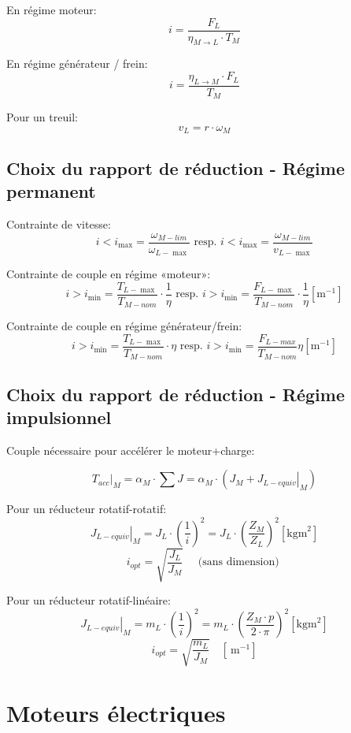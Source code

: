 \documentclass[10pt]{article} %
\begin{document}
\begin{multicols}{3}
\begin{flushleft}
			En régime moteur:
			\[i = \frac{F_L}{\eta_{M \rightarrow L} \cdot T_M} \]
			
			En régime générateur / frein:
			\[i = \frac{\eta_{L \rightarrow M} \cdot F_L}{T_M} \]
			
			Pour un treuil:
			\[v_L = r \cdot \omega_M \]

		\subsection*{Choix du rapport de réduction - Régime permanent}
	
			Contrainte de vitesse:
			\[i<i_{\max }=\frac{\omega_{M-l i m}}{\omega_{L-\max }} \text{ resp. } i<i_{\max }=\frac{\omega_{M-l i m}}{v_{L-\max }}\]
			
			Contrainte de couple en régime «moteur»:
			\[i>i_{\min }=\frac{T_{L-\max }}{T_{M-n o m}} \cdot \frac{1}{\eta} \text{ resp. } i>i_{\min }=\frac{F_{L-\max }}{T_{M-n o m}} \cdot \frac{1}{\eta}\left[\mathrm{m}^{-1}\right]\]
			
			Contrainte de couple en régime générateur/frein:
			\[i>i_{\min }=\frac{T_{L-\max }}{T_{M-n o m}} \cdot \eta \text{ resp. } i>i_{\min }=\frac{F_{L-m a x}}{T_{M-n o m}} \eta\left[\mathrm{m}^{-1}\right]\]
		
		\subsection*{Choix du rapport de réduction - Régime impulsionnel}
			
			Couple nécessaire pour accélérer le moteur+charge:
			
			\[\left.T_{a c c}\right|_{M}=\alpha_{M} \cdot \sum J=\alpha_{M} \cdot\left(J_{M}+\left.J_{L-equiv}\right|_{M}\right)\]
			
			Pour un réducteur rotatif-rotatif:
			\[\left.J_{L-equiv}\right|_{M}=J_{L} \cdot\left(\frac{1}{i}\right)^{2}=J_{L} \cdot\left(\frac{Z_{M}}{Z_{L}}\right)^{2}\left[\mathrm{kgm}^{2}\right]\]
			\[i_{o p t}=\sqrt{\frac{J_{L}}{J_{M}}} \quad \text { (sans dimension) }\]
			
			Pour un réducteur rotatif-linéaire:
			\[\left.J_{L-equiv}\right|_{M}=m_{L} \cdot\left(\frac{1}{i}\right)^{2}=m_{L} \cdot\left(\frac{Z_{M} \cdot p}{2 \cdot \pi}\right)^{2}\left[\mathrm{kgm}^{2}\right]\]
			\[i_{o p t}=\sqrt{\frac{m_{L}}{J_{M}}} \quad\left[\mathrm{~m}^{-1}\right]\]

	\section*{Moteurs électriques}
	

\end{flushleft}
\end{multicols}
\end{document}
